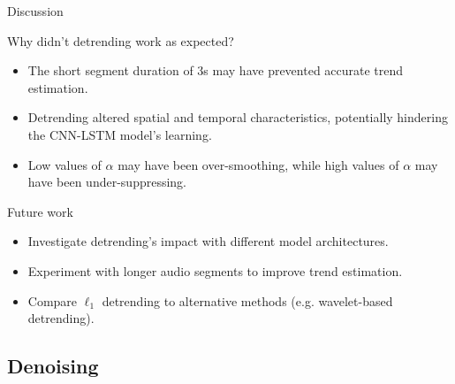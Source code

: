 \documentclass[]{beamer}
\begin{document}
\begin{frame}{Discussion}
    \small
    \begin{alertblock}{Why didn't detrending work as expected?}
        \begin{itemize}
            \item The short segment duration of 3s may have prevented accurate trend estimation.
            \item Detrending altered spatial and temporal characteristics, potentially hindering the CNN-LSTM model's learning.
            \item Low values of $\alpha$ may have been over-smoothing, while high values of $\alpha$ may have been under-suppressing. 
        \end{itemize}
    \end{alertblock}

    \begin{block}{Future work}
        \begin{itemize}
            \item Investigate detrending's impact with different model architectures.
            \item Experiment with longer audio segments to improve trend estimation.
            \item Compare $\ell_1$ detrending to alternative methods (e.g. wavelet-based detrending).
        \end{itemize}
    \end{block}
\end{frame}

\subsection{Denoising}
\end{document}
